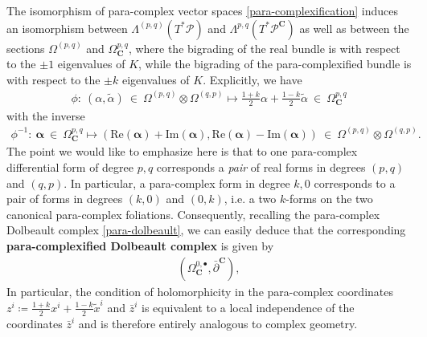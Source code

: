 \documentclass[letterpaper,12pt]{article}
\newcommand{\PS}{\mathcal{P}}
\newcommand{\ap}{\alpha}
\newcommand{\p}{\partial}
\newcommand{\xt}{{\tilde{x}}}
\newcommand{\rd}{\mathrm{d}}
\def\tl{\tilde}
\newtheorem{lemma}[theorem]{Lemma}
\theoremstyle{definition}
\theoremstyle{remark}
\theoremstyle{examples}
\begin{document}
\newcommand{\Cp}{{\mathbf{C}}}
The isomorphism of para-complex vector spaces \eqref{para-complexification} induces an isomorphism between $\Lambda^{(p,q)}(T^*\PS)$ and $\Lambda^{p,q}(T^*\PS^\mathbf{C})$ as well as between the sections $\Omega^{(p,q)}$ and $\Omega_\Cp^{p,q}$, where the bigrading of the real bundle is with respect to the $\pm 1$ eigenvalues of $K$, while the bigrading of the para-complexified bundle is with respect to the $\pm k$ eigenvalues of $K$. Explicitly, we have
\begin{align}\label{isom_bigradings1}
\phi:\ (\ap,\tl{\ap})\ \in\ \Omega^{(p,q)}\otimes \Omega^{(q,p)}\longmapsto \frac{1+k}{2}\ap + \frac{1-k}{2}\tl{\ap}\ \in\ \Omega_\Cp^{p,q}
\end{align}
with the inverse
\begin{align}\label{isom_bigradings2}
\phi^{-1}:\ \bm{\ap}\ \in\ \Omega_\Cp^{p,q}\longmapsto (\text{Re}(\bm{\alpha})+\text{Im}(\bm{\ap}),\text{Re}(\bm{\alpha})-\text{Im}(\bm{\ap}))\ \in\ \Omega^{(p,q)}\otimes \Omega^{(q,p)}.
\end{align}
The point we would like to emphasize here is that to one para-complex differential form of degree $p,q$ corresponds a {\it pair} of real forms in degrees $(p,q)$ and $(q,p)$. In particular, a para-complex form in degree $k,0$ corresponds to a pair of forms in degrees $(k,0)$ and $(0,k)$, i.e. a two $k$-forms on the two canonical para-complex foliations. Consequently, recalling the para-complex Dolbeault complex \eqref{para-dolbeault}, we can easily deduce that the corresponding {\bf para-complexified Dolbeault complex} is given by
\begin{align}
\left( \Omega^{0,\bullet}_\Cp,\bar{\p}^\Cp\right),
\end{align}
In particular, the condition of holomorphicity in the para-complex coordinates $z^i\coloneqq \frac{1+k}{2}x^i+\frac{1-k}{2}\xt^i$ and $\bar{z}^i$ is equivalent to a local independence of the coordinates $\bar{z}^i$ and is therefore entirely analogous to complex geometry.
\end{document}
